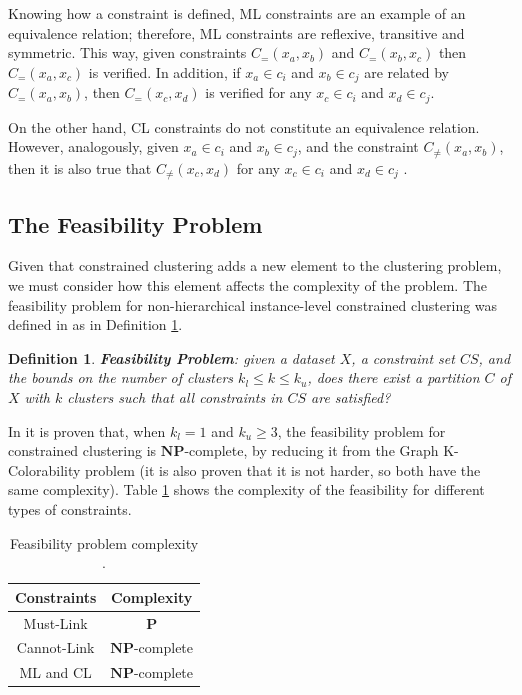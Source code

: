 \documentclass[review]{elsarticle}
\newtheorem{definition}{Definition}
\begin{document}
Knowing how a constraint is defined, ML constraints are an example of an equivalence relation; therefore, ML constraints are reflexive, transitive and symmetric. This way, given constraints $C_=(x_a,x_b)$ and $C_=(x_b,x_c)$ then $C_=(x_a,x_c)$ is verified. In addition, if $x_a \in c_i$ and $x_b \in c_j$ are related by $C_=(x_a,x_b)$, then $C_=(x_c,x_d)$ is verified for any $x_c \in c_i$ and $x_d \in c_j$. \cite{davidson2007survey}

On the other hand, CL constraints do not constitute an equivalence relation. However, analogously, given $x_a \in c_i$ and $x_b \in c_j$, and the constraint $C_{\neq}(x_a,x_b)$, then it is also true that $C_{\neq}(x_c,x_d)$ for any $x_c \in c_i$ and $x_d \in c_j$ \cite{davidson2007survey}.

\subsection{The Feasibility Problem} \label{sec:BackFeas}

Given that constrained clustering adds a new element to the clustering problem, we must consider how this element affects the complexity of the problem. The feasibility problem for non-hierarchical instance-level constrained clustering was defined in \cite{davidson2005clustering} as in Definition \ref{def1}.

\begin{definition}

	\textbf{Feasibility Problem}: given a dataset $X$, a constraint set $CS$, and the bounds on the number of clusters $k_l \leq k \leq k_u$, does there exist a partition $C$ of $X$ with $k$ clusters such that all constraints in $CS$ are satisfied? \cite{davidson2005clustering}
	\label{def1}

\end{definition}

In \cite{davidson2005clustering} it is proven that, when $k_l = 1$ and $k_u \ge 3$, the feasibility problem for constrained clustering is $\mathbf{NP}$-complete, by reducing it from the Graph K-Colorability problem (it is also proven that it is not harder, so both have the same complexity). Table \ref{tab:feasibility} shows the complexity of the feasibility for different types of constraints.

\begin{table}[!h]
	\centering
	\setlength{\tabcolsep}{7pt}
	\renewcommand{\arraystretch}{1.2}
		\begin{tabular}{c c}
			\hline
			Constraints & Complexity \\
			\hline
			Must-Link & $\mathbf{P}$\\
			Cannot-Link & $\mathbf{NP}$-complete\\
			ML and CL & $\mathbf{NP}$-complete\\
			\hline

		\end{tabular}%
	\caption{Feasibility problem complexity \cite{davidson2005clustering}.}
	\label{tab:feasibility}
\end{table}
\end{document}
